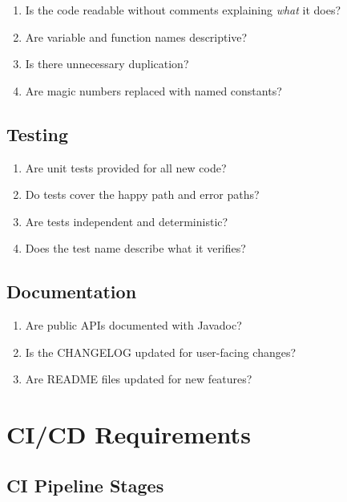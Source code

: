 \documentclass[
    language=english,
    doctype=standard,
    institution=none,
    titlestyle=book,
    oneside,
]{../../omnilatex}
\begin{document}
\begin{enumerate}
    \item Is the code readable without comments explaining \emph{what} it
        does?
    \item Are variable and function names descriptive?
    \item Is there unnecessary duplication?
    \item Are magic numbers replaced with named constants?
\end{enumerate}

\section{Testing}

\begin{enumerate}
    \item Are unit tests provided for all new code?
    \item Do tests cover the happy path and error paths?
    \item Are tests independent and deterministic?
    \item Does the test name describe what it verifies?
\end{enumerate}

\section{Documentation}

\begin{enumerate}
    \item Are public APIs documented with Javadoc?
    \item Is the CHANGELOG updated for user-facing changes?
    \item Are README files updated for new features?
\end{enumerate}

\chapter{CI/CD Requirements}
\label{sec:cicd}

\section{CI Pipeline Stages}
\end{document}
